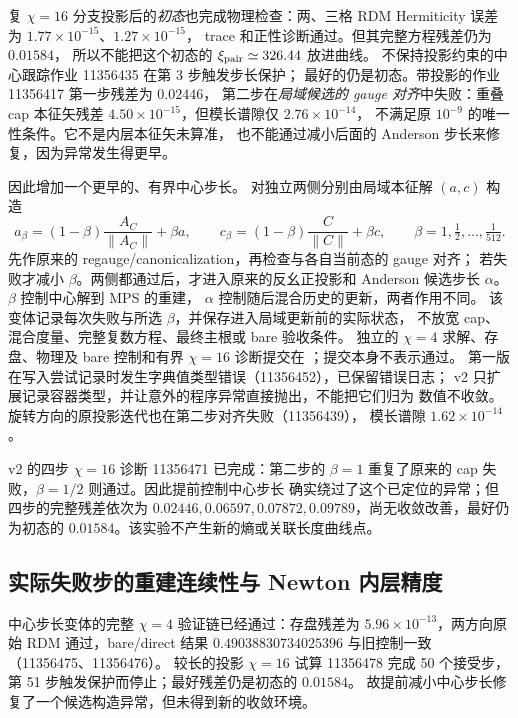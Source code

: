 复 $\chi=16$ 分支投影后的\emph{初态}也完成物理检查：两、三格 RDM
Hermiticity 误差为 $1.77\times10^{-15}$、$1.27\times10^{-15}$，
trace 和正性诊断通过。但其完整方程残差仍为 $0.01584$，
所以不能把这个初态的 $\xi_{\rm pair}\simeq326.44$ 放进曲线。
不保持投影约束的中心跟踪作业 11356435 在第 3 步触发步长保护；
最好的仍是初态。带投影的作业 11356417 第一步残差为 $0.02446$，
第二步在\emph{局域候选的 gauge 对齐}中失败：重叠 cap 本征矢残差
$4.50\times10^{-15}$，但模长谱隙仅 $2.76\times10^{-14}$，
不满足原 $10^{-9}$ 的唯一性条件。它不是内层本征矢未算准，
也不能通过减小后面的 Anderson 步长来修复，因为异常发生得更早。

 因此增加一个更早的、有界中心步长。
对独立两侧分别由局域本征解 $(a,c)$ 构造
\begin{equation}
 a_\beta=(1-\beta)\frac{A_C}{\|A_C\|}+\beta a,
 \qquad
 c_\beta=(1-\beta)\frac{C}{\|C\|}+\beta c,
 \qquad \beta=1,\tfrac12,\ldots,\tfrac1{512}.
\end{equation}
先作原来的 regauge/canonicalization，再检查与各自当前态的 gauge 对齐；
若失败才减小 $\beta$。两侧都通过后，才进入原来的反幺正投影和
Anderson 候选步长 $\alpha$。$\beta$ 控制中心解到 MPS 的重建，
$\alpha$ 控制随后混合历史的更新，两者作用不同。
该变体记录每次失败与所选 $\beta$，并保存进入局域更新前的实际状态，
不放宽 cap、混合度量、完整复数方程、最终主根或 bare 验收条件。
独立的 $\chi=4$ 求解、存盘、物理及 bare 控制和有界 $\chi=16$
诊断提交在 ；提交本身不表示通过。
第一版在写入尝试记录时发生字典值类型错误（11356452），已保留错误日志；
v2 只扩展记录容器类型，并让意外的程序异常直接抛出，不能把它们归为
数值不收敛。旋转方向的原投影迭代也在第二步对齐失败（11356439），
模长谱隙 $1.62\times10^{-14}$。

v2 的四步 $\chi=16$ 诊断 11356471 已完成：第二步的 $\beta=1$
重复了原来的 cap 失败，$\beta=1/2$ 则通过。因此提前控制中心步长
确实绕过了这个已定位的异常；但四步的完整残差依次为
$0.02446,0.06597,0.07872,0.09789$，尚无收敛改善，最好仍为初态的
$0.01584$。该实验不产生新的熵或关联长度曲线点。

\subsection{实际失败步的重建连续性与 Newton 内层精度}
中心步长变体的完整 $\chi=4$ 验证链已经通过：存盘残差为
$5.96\times10^{-13}$，两方向原始 RDM 通过，bare/direct 结果
$0.49038830734025396$ 与旧控制一致（11356475、11356476）。
较长的投影 $\chi=16$ 试算 11356478 完成 50 个接受步，
第 51 步触发保护而停止；最好残差仍是初态的 $0.01584$。
故提前减小中心步长修复了一个候选构造异常，但未得到新的收敛环境。

